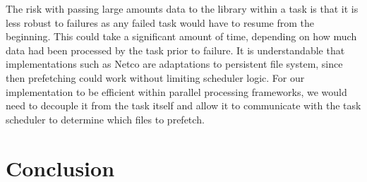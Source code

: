 The risk with passing large amounts data to the library within a task is that it
is less robust to failures as any failed task would have to resume from the
beginning. This could take a significant amount of time, depending on how much
data had been processed by the task prior to failure.
It is understandable that implementations such as Netco are adaptations to
persistent file system, since then prefetching could work without limiting
scheduler logic. For our implementation to be efficient within parallel
processing frameworks, we would need to decouple it from the task itself and
allow it to communicate with the task scheduler to determine which files to
prefetch.



\section{Conclusion}



